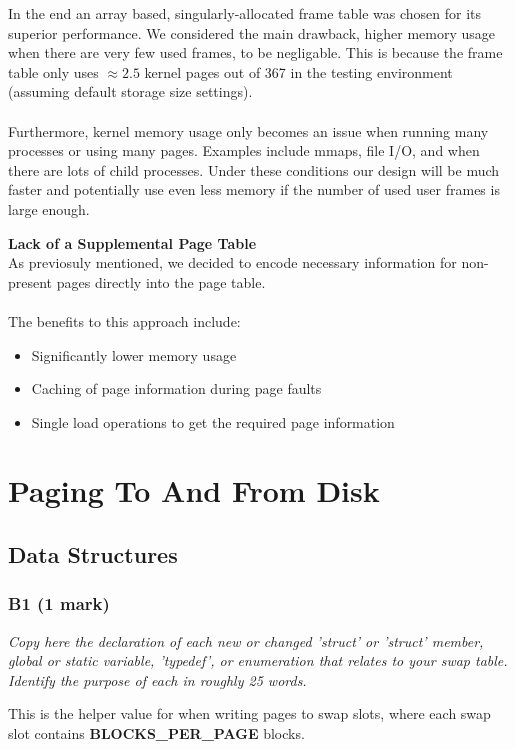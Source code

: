 \documentclass{report}
\newcommand{\question}[1]{\textit{#1} \ }
\newcommand{\file}[1]{\textcolor{YellowGreen}{\textbf{#1}}}
\newcommand{\const}[1]{\textcolor{BrickRed}{\textbf{#1}}}
\newcommand{\pintoscode}[4]{}
\newcommand{\pintosfile}[3]{\pintoscode{#1}{#2}{\file{#3}}{#3}}
\newcommand{\compitem}[1]{\begin{itemize}\setlength\itemsep{-0.1em}#1\end{itemize}}
\begin{document}
				In the end an array based, singularly-allocated frame table was 
				chosen for its superior performance. We considered the main 
				drawback, higher memory usage when there 
				are very few used frames, to be negligable.
				This is because the frame table only uses $\approx 2.5$ kernel pages out of 367
				in the testing environment (assuming default storage size settings).
				\\
				\\ Furthermore, kernel memory usage only becomes an issue when 
				running many processes or using many pages. Examples include
				mmaps, file I/O, and when there are lots of child processes. 
				Under these conditions our design will be much faster and 
				potentially use even less memory if the number of used user 
				frames is large enough.
				
				\textbf{Lack of a Supplemental Page Table}
				\\As previosuly mentioned, we decided to encode necessary 
				information for non-present pages directly into the page table.
				\\
				\\ The benefits to this approach include:
				\compitem{
					\item Significantly lower memory usage
					\item Caching of page information during page faults
					\item Single load operations to get the required page information
				}
				
	\section*{Paging To And From Disk}
		\subsection*{Data Structures}
			\subsubsection*{B1 (1 mark)}
				\question{Copy here the declaration of each new or changed 'struct' or
				'struct' member, global or static variable, 'typedef', or enumeration 
				that relates to your swap table. Identify the purpose of each in roughly
				25 words.}
				
				\pintosfile{10}{10}{swap.c}
				This is the helper value for when writing pages to swap slots, where each swap 
				slot contains \const{BLOCKS\_PER\_PAGE} blocks.
\end{document}

